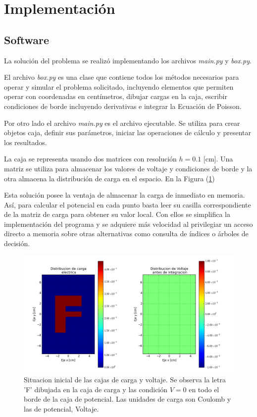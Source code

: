 \documentclass{article}
\begin{document}
\section{Implementación}

\subsection{Software}

La solución del problema se realizó implementando los archivos \emph{main.py} y \emph{box.py}.

El archivo \emph{box.py} es una clase que contiene todos los métodos necesarios para operar y simular el problema solicitado, incluyendo elementos que permiten operar con coordenadas en centímetros, dibujar cargas en la caja, escribir condiciones de borde incluyendo derivativas e integrar la Ecuación de Poisson.

Por otro lado el archivo \emph{main.py} es el archivo ejecutable. Se utiliza para crear objetos caja, definir sus parámetros, iniciar las operaciones de cálculo y presentar los resultados.

La caja se representa usando dos matrices con resolución $h=0.1$ [cm]. Una matriz se utiliza para almacenar los valores de voltaje y condiciones de borde y la otra almacena la distribución de carga en el espacio. En la Figura (\ref{fig:situacion_inicial})

Esta solución posee la ventaja de almacenar la carga de inmediato en memoria. Así, para calcular el potencial en cada punto basta leer su casilla correspondiente de la matriz de carga para obtener su valor local. Con ellos se simplifica la implementación del programa y se adquiere más velocidad al privilegiar un acceso directo a memoria sobre otras alternativas como consulta de índices o árboles de decisión.

\begin{figure}
  \centering
  \includegraphics[scale=0.5]{images/situacion_inicial.png}
  \caption{Situacion inicial de las cajas de carga y voltaje. Se observa la letra 'F' dibujada en la caja de carga y las condición $V=0$ en todo el borde de la caja de potencial. Las unidades de carga son Coulomb y las de potencial, Voltaje.}
  \label{fig:situacion_inicial}
\end{figure}
\end{document}
